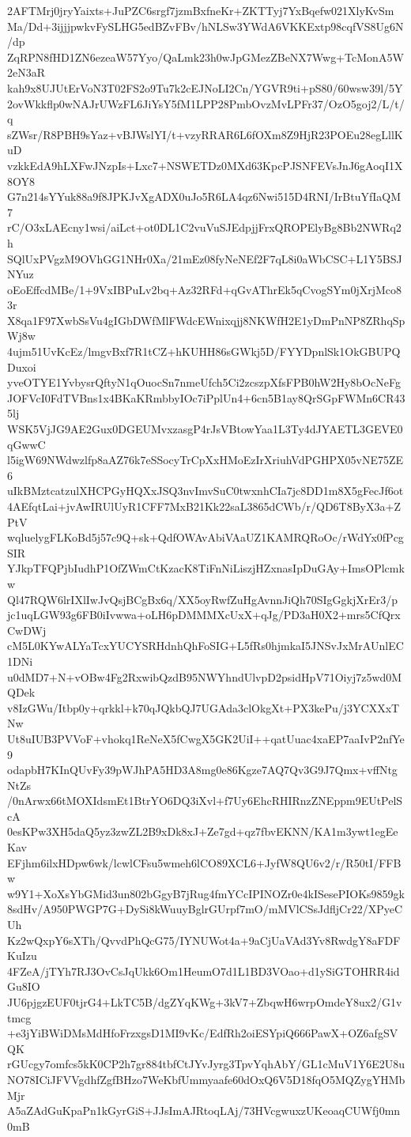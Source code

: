 2AFTMrj0jryYaixts+JuPZC6srgf7jzmBxfneKr+ZKTTyj7YxBqefw021XlyKvSm
Ma/Dd+3ijjjpwkvFySLHG5edBZvFBv/hNLSw3YWdA6VKKExtp98cqfVS8Ug6N/dp
ZqRPN8fHD1ZN6ezeaW57Yyo/QaLmk23h0wJpGMezZBeNX7Wwg+TcMonA5W2eN3aR
kah9x8UJUtErVoN3T02FS2o9Tu7k2cEJNoLI2Cn/YGVR9ti+pS80/60wsw39l/5Y
2ovWkkflp0wNAJrUWzFL6JiYsY5fM1LPP28PmbOvzMvLPFr37/OzO5goj2/L/t/q
sZWsr/R8PBH9sYaz+vBJWslYI/t+vzyRRAR6L6fOXm8Z9HjR23POEu28egLllKuD
vzkkEdA9hLXFwJNzpIs+Lxc7+NSWETDz0MXd63KpcPJSNFEVsJnJ6gAoqI1X8OY8
G7n214sYYuk88a9f8JPKJvXgADX0uJo5R6LA4qz6Nwi515D4RNI/IrBtuYfIaQM7
rC/O3xLAEcny1wsi/aiLct+ot0DL1C2vuVuSJEdpjjFrxQROPElyBg8Bb2NWRq2h
SQlUxPVgzM9OVhGG1NHr0Xa/21mEz08fyNeNEf2F7qL8i0aWbCSC+L1Y5BSJNYuz
oEoEffcdMBe/1+9VxIBPuLv2bq+Az32RFd+qGvAThrEk5qCvogSYm0jXrjMco83r
X8qa1F97XwbSsVu4gIGbDWfMlFWdcEWnixqjj8NKWfH2E1yDmPnNP8ZRhqSpWj8w
4ujm51UvKcEz/lmgvBxf7R1tCZ+hKUHH86sGWkj5D/FYYDpnlSk1OkGBUPQDuxoi
yveOTYE1YvbysrQftyN1qOuocSn7nmeUfch5Ci2zcszpXfsFPB0hW2Hy8bOcNeFg
JOFVcI0FdTVBns1x4BKaKRmbbyIOc7iPplUn4+6cn5B1ay8QrSGpFWMn6CR435lj
WSK5VjJG9AE2Gux0DGEUMvxzasgP4rJsVBtowYaa1L3Ty4dJYAETL3GEVE0qGwwC
l5igW69NWdwzlfp8aAZ76k7eSSocyTrCpXxHMoEzIrXriuhVdPGHPX05vNE75ZE6
uIkBMztcatzulXHCPGyHQXxJSQ3nvImvSuC0twxnhCIa7jc8DD1m8X5gFecJf6ot
4AEfqtLai+jvAwIRUlUyR1CFF7MxB21Kk22saL3865dCWb/r/QD6T8ByX3a+ZPtV
wqluelygFLKoBd5j57c9Q+sk+QdfOWAvAbiVAaUZ1KAMRQRoOc/rWdYx0fPcgSIR
YJkpTFQPjbIudhP1OfZWmCtKzacK8TiFnNiLiszjHZxnasIpDuGAy+ImsOPlcmkw
Ql47RQW6lrIXlIwJvQsjBCgBx6q/XX5oyRwfZuHgAvnnJiQh70SIgGgkjXrEr3/p
jc1uqLGW93g6FB0iIvwwa+oLH6pDMMMXcUxX+qJg/PD3aH0X2+mrs5CfQrxCwDWj
cM5L0KYwALYaTcxYUCYSRHdnhQhFoSIG+L5fRs0hjmkaI5JNSvJxMrAUnlEC1DNi
u0dMD7+N+vOBw4Fg2RxwibQzdB95NWYhndUlvpD2psidHpV71Oiyj7z5wd0MQDek
v8IzGWu/Itbp0y+qrkkl+k70qJQkbQJ7UGAda3clOkgXt+PX3kePu/j3YCXXxTNw
Ut8uIUB3PVVoF+vhokq1ReNeX5fCwgX5GK2UiI++qatUuac4xaEP7aaIvP2nfYe9
odapbH7KInQUvFy39pWJhPA5HD3A8mg0e86Kgze7AQ7Qv3G9J7Qmx+vffNtgNtZs
/0nArwx66tMOXIdsmEt1BtrYO6DQ3iXvl+f7Uy6EhcRHIRnzZNEppm9EUtPelScA
0esKPw3XH5daQ5yz3zwZL2B9xDk8xJ+Ze7gd+qz7fbvEKNN/KA1m3ywt1egEeKav
EFjhm6ilxHDpw6wk/lcwlCFsu5wmeh6lCO89XCL6+JyfW8QU6v2/r/R50tI/FFBw
w9Y1+XoXsYbGMid3un802bGgyB7jRug4fmYCcIPINOZr0e4kISesePIOKs9859gk
8sdHv/A950PWGP7G+DySi8kWuuyBglrGUrpf7mO/mMVlCSsJdfljCr22/XPyeCUh
Kz2wQxpY6sXTh/QvvdPhQcG75/IYNUWot4a+9aCjUaVAd3Yv8RwdgY8aFDFKuIzu
4FZeA/jTYh7RJ3OvCsJqUkk6Om1HeumO7d1L1BD3VOao+d1ySiGTOHRR4idGu8IO
JU6pjgzEUF0tjrG4+LkTC5B/dgZYqKWg+3kV7+ZbqwH6wrpOmdeY8ux2/G1vtmcg
+e3jYiBWiDMsMdHfoFrzxgsD1MI9vKc/EdfRh2oiESYpiQ666PawX+OZ6afgSVQK
rGUcgy7omfcs5kK0CP2h7gr884tbfCtJYvJyrg3TpvYqhAbY/GL1cMuV1Y6E2U8u
NO78ICiJFVVgdhfZgfBHzo7WeKbfUmmyaafe60dOxQ6V5D18fqO5MQZygYHMbMjr
A5aZAdGuKpaPn1kGyrGiS+JJsImAJRtoqLAj/73HVcgwuxzUKeoaqCUWfj0mn0mB
